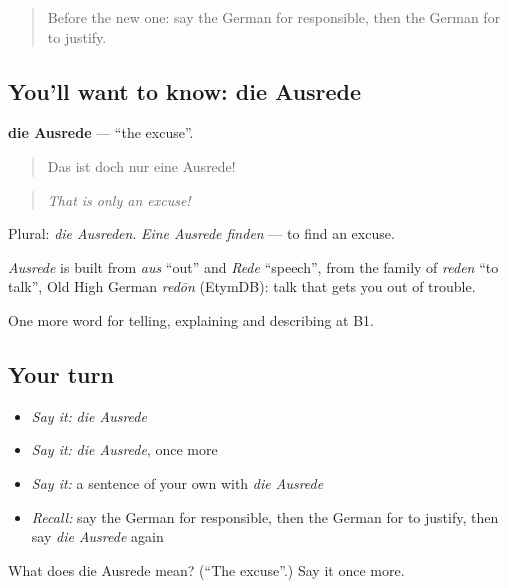 \begin{quote}
Before the new one: say the German for responsible, then the German for to justify.
\end{quote}

\subsection*{You'll want to know: die Ausrede}
\textbf{die Ausrede} — \textquotedblleft{}the excuse\textquotedblright{}.

\begin{quote}
Das ist doch nur eine Ausrede!
\end{quote}

\begin{quote}
\emph{That is only an excuse!}
\end{quote}

Plural: \emph{die Ausreden}. \emph{Eine Ausrede finden} — to find an excuse.

\begin{cousinweb}
\emph{Ausrede} is built from \emph{aus} \textquotedblleft{}out\textquotedblright{} and \emph{Rede} \textquotedblleft{}speech\textquotedblright{}, from the family of \emph{reden} \textquotedblleft{}to talk\textquotedblright{}, Old High German \emph{redōn} (EtymDB): talk that gets you out of trouble.
\end{cousinweb}

\begin{grammarlens}[title={What you've built}]
One more word for telling, explaining and describing at B1.
\end{grammarlens}

\subsection*{Your turn}
\begin{itemize}
\raggedright
  \item \emph{Say it:} \emph{die Ausrede}
  \item \emph{Say it:} \emph{die Ausrede}, once more
  \item \emph{Say it:} a sentence of your own with \emph{die Ausrede}
  \item \emph{Recall:} say the German for responsible, then the German for to justify, then say \emph{die Ausrede} again
\end{itemize}

\begin{tcolorbox}[breakable,colback=teal!4,colframe=teal!35!black,title={Before you move on}]
What does die Ausrede mean? (\textquotedblleft{}The excuse\textquotedblright{}.) Say it once more.
\end{tcolorbox}
